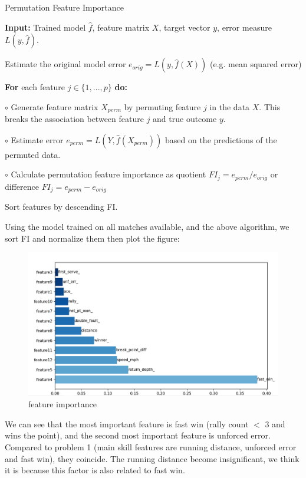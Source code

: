 \begin{algorithm}[H]
    \caption{Permutation Feature Importance}  
    \textbf{Input:} Trained model $\hat{f}$, feature matrix $X$, target vector $y$, error measure $L(y, \hat{f})$.  
      
    Estimate the original model error $e_{orig} = L(y, \hat{f}(X))$ (e.g. mean squared error)  
      
    \textbf{For} each feature $j \in \{1, ..., p\}$ \textbf{do:}  
      
    \quad\quad $\circ$ Generate feature matrix $X_{perm}$ by permuting feature $j$ in the data $X$. This breaks the association between feature $j$ and true outcome $y$.  
      
    \quad\quad $\circ$ Estimate error $e_{perm} = L(Y, \hat{f}(X_{perm}))$ based on the predictions of the permuted data.  
      
    \quad\quad $\circ$ Calculate permutation feature importance as quotient $FI_j = e_{perm} / e_{orig}$ or difference $FI_j = e_{perm} - e_{orig}$  
      
    Sort features by descending FI.
\end{algorithm}

Using the model trained on all matches available, and the above algorithm,
we sort FI and normalize them then plot the figure:

\begin{figure}[H]
    \centering
    \includegraphics[scale=0.6]{mainmatter/imgs/8.png}
    \caption{feature importance}
\end{figure}

We can see that the most important feature is fast win (rally count $<$ 3 and wins the point),
and the second most important feature is unforced error. Compared to problem 1 (main skill features are
running distance, unforced error and fast win), they coincide. The running distance become insignificant, 
we think it is because this factor is also related to fast win.

